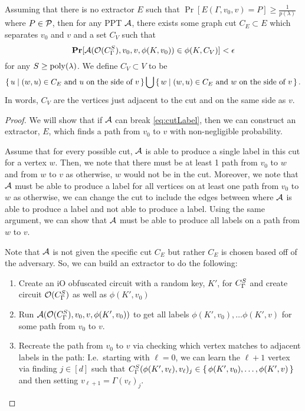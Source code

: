 \begin{lemma}
	\label{lemma:cutBaseCase}
	Assuming that there is no extractor $E$ such that $\Pr[E(\Gamma, v_0, v) = P] \geq \frac{1}{p(\lambda)}$
	where $P \in \mathcal{P}$, then for any PPT $\mathcal{A}$, there exists some graph cut 
	$C_E \subset E$ which separates $v_0$ and $v$ and a set $C_V$ such that
	\begin{equation}
		\label{eq:cutLabel}
		\operatorname*{\mathbf{Pr}}[\mathcal{A}(\mathcal{O}({C_\Gamma^S}), v_0, v, \phi(K, v_0)) \in \phi(K, C_V)] < \epsilon
	\end{equation}
		for any $S \geq \operatorname{poly}(\lambda)$.
		We define $C_V \subset V$ to be
	\begin{equation*}
		\set{ u \mid (w, u) \in C_E \text{ and } u \text { on the side of } v} \bigcup \set{ w \mid (w, u) \in C_E \text{ and } w \text { on the side of } v}.
	\end{equation*}
	In words, $C_V$ are the vertices just adjacent to the cut and on the same side as $v$.
	\begin{proof}
		We will show that if $\mathcal{A}$ can break \cref{eq:cutLabel}, then we can construct an extractor,
		$E$, which finds a path from $v_0$ to $v$ with non-negligible probability.

		Assume that for every possible cut, $\mathcal{A}$ is able to produce a single label in this cut for a vertex $w$.
		Then, we note that there must be at least 1 path from $v_0$ to $w$ and from $w$ to $v$ as otherwise, $w$ would not be in the cut.
		Moreover, we note that $\mathcal{A}$ must be able to produce a label for all vertices on at least one path
		from $v_0$ to $w$ as otherwise, we can change the cut to include the edges between where
		$\mathcal{A}$ is able to produce a label and not able to produce a label. Using the same argument,
		we can show that $\mathcal{A}$ must be able to produce all labels on a path from $w$ to $v$.

		Note that $\mathcal{A}$ is not given the specific cut $C_E$ but rather $C_E$ is chosen based off of the adversary.
		So, we can build an extractor to do the following:
		\begin{enumerate}
			\item Create an iO obfuscated circuit with a random key, $K'$, for ${C_\Gamma^S}$ and create circuit $\mathcal{O}({C_\Gamma^S})$
			as well as $\phi(K', v_0)$
			\item Run $\mathcal{A}(\mathcal{O}({C_\Gamma^S}), v_0, v, \phi(K', v_0))$ to get all labels $\phi(K', v_0), \dots \phi(K', v)$
			for some path from $v_0$ to $v$.
			\item Recreate the path from $v_0$ to $v$ via checking which vertex matches to adjacent labels in the path:
			I.e.\ starting with $\ell = 0$, we can learn the $\ell + 1$ vertex via finding $j \in [d]$ such that
			${C_\Gamma^S}(\phi(K', v_\ell), v_\ell)_j \in \set{\phi(K', v_0), \dots, \phi(K', v)}$
			 and then setting $v_{\ell + 1} = \Gamma(v_\ell)_j$.
		\end{enumerate}
	\end{proof}
\end{lemma}

